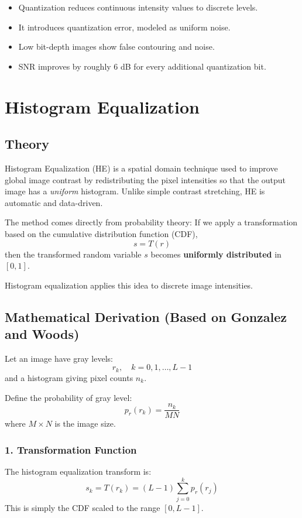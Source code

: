 \documentclass{AnantDocumentation}
\begin{document}
\begin{itemize}
\item Quantization reduces continuous intensity values to discrete levels.
\item It introduces quantization error, modeled as uniform noise.
\item Low bit-depth images show false contouring and noise.
\item SNR improves by roughly 6 dB for every additional quantization bit.
\end{itemize}

\section{Histogram Equalization}

\subsection{Theory}

Histogram Equalization (HE) is a spatial domain technique used to improve global image contrast by redistributing the pixel intensities so that the output image has a \emph{uniform} histogram.  
Unlike simple contrast stretching, HE is automatic and data-driven.

The method comes directly from probability theory:  
If we apply a transformation based on the cumulative distribution function (CDF),  
\[
s = T(r)
\]
then the transformed random variable \(s\) becomes \textbf{uniformly distributed} in \([0,1]\).

Histogram equalization applies this idea to discrete image intensities.

\subsection{Mathematical Derivation (Based on Gonzalez and Woods)}

Let an image have gray levels:
\[
r_k,\quad k = 0,1,\ldots,L-1
\]
and a histogram giving pixel counts \(n_k\).  

Define the probability of gray level:
\[
p_r(r_k) = \frac{n_k}{MN}
\]
where \(M \times N\) is the image size.

\subsubsection{1. Transformation Function}

The histogram equalization transform is:
\[
s_k = T(r_k) = (L-1) \sum_{j=0}^{k} p_r(r_j)
\]
This is simply the CDF scaled to the range \([0, L-1]\).
\end{document}
